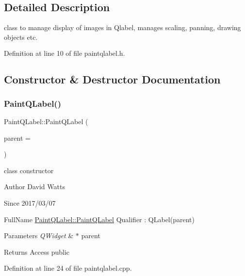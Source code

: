 \subsection{Detailed Description}
class to manage display of images in Qlabel, manages scaling, panning, drawing objects etc. 

Definition at line 10 of file paintqlabel.\+h.



\subsection{Constructor \& Destructor Documentation}
\mbox{\label{class_paint_q_label_a079e85cd5d1ec31f20f3c0bb8b510ec2}} 
\subsubsection{\texorpdfstring{Paint\+Q\+Label()}{PaintQLabel()}}
{\footnotesize\ttfamily Paint\+Q\+Label\+::\+Paint\+Q\+Label (\begin{DoxyParamCaption}\item[{Q\+Widget $\ast$}]{parent = {} }\end{DoxyParamCaption})\hspace{0.3cm}{\ttfamily [explicit]}}

class constructor

\begin{DoxyAuthor}{Author}
David Watts 
\end{DoxyAuthor}
\begin{DoxySince}{Since}
2017/03/07
\end{DoxySince}
Full\+Name \hyperlink{class_paint_q_label_a079e85cd5d1ec31f20f3c0bb8b510ec2}{Paint\+Q\+Label\+::\+Paint\+Q\+Label} Qualifier \+: Q\+Label(parent) 
\begin{DoxyParams}{Parameters}
{\em Q\+Widget} & $\ast$ parent \\
\hline
\end{DoxyParams}
\begin{DoxyReturn}{Returns}
Access public 
\end{DoxyReturn}


Definition at line 24 of file paintqlabel.\+cpp.

